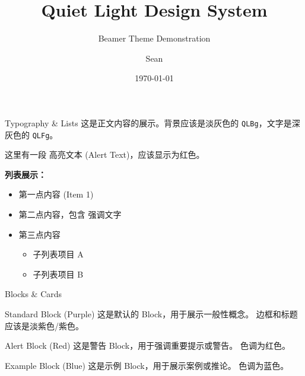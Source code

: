 \documentclass[aspectratio=169]{beamer}
\title{Quiet Light Design System}
\subtitle{Beamer Theme Demonstration}
\author{Sean}
\date{\today}
\begin{document}
\begin{frame}[plain]
    \vspace*{-0.56cm}
    \titlepage
\end{frame}

\begin{frame}{Typography \& Lists}
    这是正文内容的展示。背景应该是淡灰色的 \texttt{QLBg}，文字是深灰色的 \texttt{QLFg}。
    
    这里有一段 \alert{高亮文本 (Alert Text)}，应该显示为红色。

    \vspace{0.5cm}
    
    \textbf{列表展示：}
    \begin{itemize}
        \item 第一点内容 (Item 1)
        \item 第二点内容，包含 \alert{强调文字}
        \item 第三点内容
        \begin{itemize}
            \item 子列表项目 A
            \item 子列表项目 B
        \end{itemize}
    \end{itemize}
\end{frame}

\begin{frame}{Blocks \& Cards}
    \begin{block}{Standard Block (Purple)}
        这是默认的 Block，用于展示一般性概念。
        边框和标题应该是淡紫色/紫色。
    \end{block}

    \begin{alertblock}{Alert Block (Red)}
        这是警告 Block，用于强调重要提示或警告。
        色调为红色。
    \end{alertblock}

    \begin{exampleblock}{Example Block (Blue)}
        这是示例 Block，用于展示案例或推论。
        色调为蓝色。
    \end{exampleblock}
\end{frame}
\end{document}
